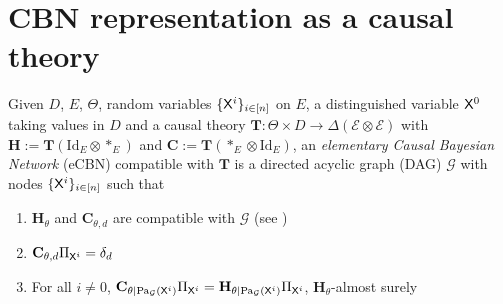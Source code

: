 
\section{CBN representation as a causal theory}\label{sec:cbn_as_ct}

\begin{definition}

Given $D$, $E$, $\Theta$, random variables $\{\mathsf{X}^i\}_{i\in [n]}$ on $E$, a distinguished variable $\mathsf{X}^0$ taking values in $D$ and a causal theory $\mathbf{T}:\Theta\times D\to \Delta(\mathcal{E}\otimes\mathcal{E})$ with $\mathbf{H}:= \mathbf{T}(\mathrm{Id}_E\otimes *_E)$ and $\mathbf{C}:= \mathbf{T}(*_E\otimes \mathrm{Id}_E)$, an \emph{elementary Causal Bayesian Network} (eCBN) compatible with $\mathbf{T}$ is a directed acyclic graph (DAG) $\mathcal{G}$ with nodes $\{\mathsf{X}^i\}_{i\in [n]}$ such that

\begin{enumerate}
    \item $\mathbf{H}_\theta$ and $\mathbf{C}_{\theta,d}$ are compatible with $\mathcal{G}$ (see \citet{pearl_causality:_2009})
    \item $\mathbf{C}_{\theta,d} \Pi_{\mathsf{X}^i}=\delta_{d}$
    \item For all $i\neq 0$, $\mathbf{C}_{\theta|\text{Pa}_{\mathcal{G}}(\mathsf{X}^i)} \Pi_{\mathsf{X}^i}=\mathbf{H}_{\theta|\text{Pa}_{\mathcal{G}}(\mathsf{X}^i)}\Pi_{\mathsf{X}^i} $, $\mathbf{H}_\theta$-almost surely
\end{enumerate}
\end{definition}

